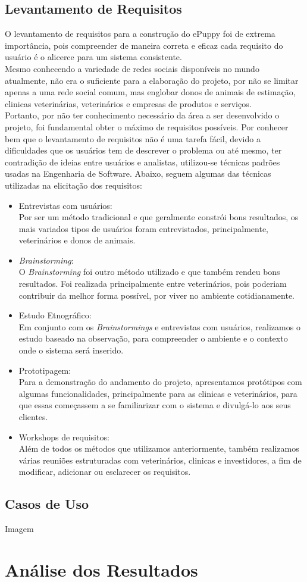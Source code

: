 \subsection{Levantamento de Requisitos}
O levantamento de requisitos para a construção do ePuppy foi de extrema importância, pois compreender de maneira correta e eficaz cada requisito do usuário é o alicerce para um sistema consistente. 
\\
\indent
Mesmo conhecendo a variedade de redes sociais disponíveis no mundo atualmente, não era o suficiente para a elaboração do projeto, por não se limitar apenas a uma rede social comum, mas englobar donos de animais de estimação, clinicas veterinárias, veterinários e empresas de produtos e serviços.
\\
\indent
Portanto, por não ter conhecimento necessário da área a ser desenvolvido o projeto, foi fundamental obter o máximo de requisitos possíveis. Por conhecer bem que o levantamento de requisitos não é uma tarefa fácil, devido a dificuldades que os usuários tem de descrever o problema ou até mesmo, ter contradição de ideias entre usuários e analistas, utilizou-se técnicas padrões usadas na Engenharia de Software. Abaixo, seguem algumas das técnicas utilizadas na elicitação dos requisitos:
\begin{itemize}
   \item Entrevistas com usuários:
   \\
   \indent
   Por ser um método tradicional e que geralmente constrói bons resultados, os mais variados tipos de usuários foram entrevistados, principalmente, veterinários e donos de animais. 
   \item {\it Brainstorming}:
    \\
   \indent
   O {\it Brainstorming} foi outro método utilizado e que também rendeu bons resultados. Foi realizada principalmente entre veterinários, pois poderiam contribuir da melhor forma possível, por viver no ambiente cotidianamente. 
   \item Estudo Etnográfico:
   \\
   \indent
   Em conjunto com os {\it Brainstormings} e entrevistas com usuários, realizamos o estudo baseado na observação, para compreender o ambiente e o contexto onde o sistema será inserido.
   \item Prototipagem: 
   \\
   \indent
   Para a demonstração do andamento do projeto, apresentamos protótipos com algumas funcionalidades, principalmente para as clinicas e veterinários, para que essas começassem a se familiarizar com o sistema e divulgá-lo aos seus clientes.
   \item Workshops de requisitos:
   \\
   \indent
   Além de todos os métodos que utilizamos anteriormente, também realizamos várias reuniões estruturadas com veterinários, clinicas e investidores, a fim de modificar, adicionar ou esclarecer os requisitos.
 \end{itemize}
\subsection{Casos de Uso}

Imagem



\section{Análise dos Resultados}

